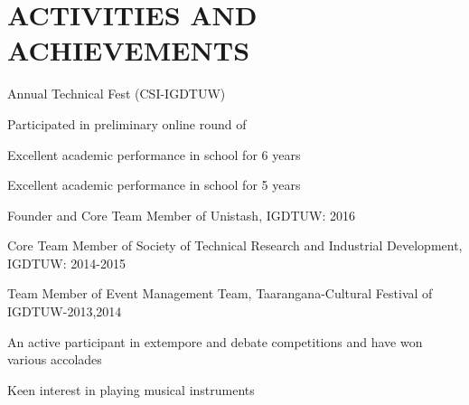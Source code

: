\documentclass[]{deedy-resume-openfont}
\begin{document}
\begin{minipage}[t]{0.66\textwidth}
\section{ACTIVITIES AND ACHIEVEMENTS} 
\begin{tightemize}
\item {}Annual Technical Fest (CSI-IGDTUW)
\item Participated in preliminary online round of 
\item {}Excellent academic performance in school for 6 years
\item {}Excellent academic performance in school for 5 years
\end{tightemize}
\sectionsep

\begin{tightemize}
\item Founder and Core Team Member of Unistash, IGDTUW: 2016
\item Core Team Member of Society of Technical Research and Industrial Development, IGDTUW: 2014-2015
\item Team Member of Event Management Team, Taarangana-Cultural Festival of IGDTUW-2013,2014 \\
\end{tightemize}
\sectionsep

\begin{tightemize}
\item An active participant in extempore and debate competitions and have won various accolades
\item Keen interest in playing musical instruments
\end{tightemize} 

\end{minipage} 
\end{document}
